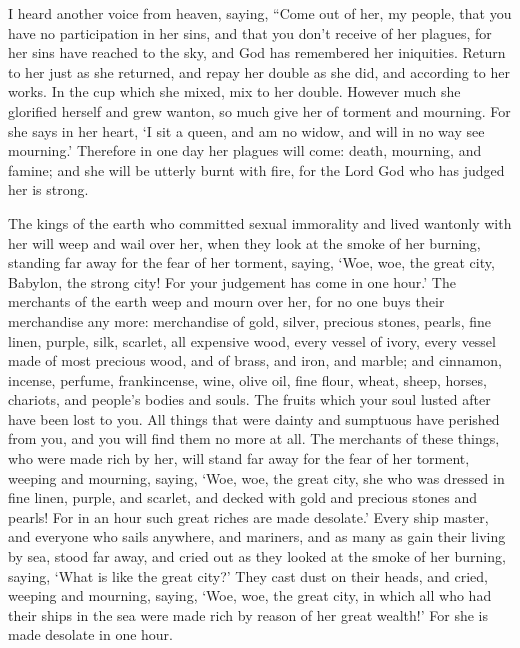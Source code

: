  I heard another voice from heaven, saying, ``Come out of
her, my people, that you have no participation in her sins, and that you
don't receive of her plagues,  for her sins have reached to
the sky, and God has remembered her iniquities.  Return to
her just as she returned, and repay her double as she did, and according
to her works. In the cup which she mixed, mix to her double.
 However much she glorified herself and grew wanton, so much
give her of torment and mourning. For she says in her heart, `I sit a
queen, and am no widow, and will in no way see mourning.' 
Therefore in one day her plagues will come: death, mourning, and famine;
and she will be utterly burnt with fire, for the Lord God who has judged
her is strong.

 The kings of the earth who committed sexual immorality and
lived wantonly with her will weep and wail over her, when they look at
the smoke of her burning,  standing far away for the fear
of her torment, saying, `Woe, woe, the great city, Babylon, the strong
city! For your judgement has come in one hour.'  The
merchants of the earth weep and mourn over her, for no one buys their
merchandise any more:  merchandise of gold, silver,
precious stones, pearls, fine linen, purple, silk, scarlet, all
expensive wood, every vessel of ivory, every vessel made of most
precious wood, and of brass, and iron, and marble;  and
cinnamon, incense, perfume, frankincense, wine, olive oil, fine flour,
wheat, sheep, horses, chariots, and people's bodies and souls.
 The fruits which your soul lusted after have been lost to
you. All things that were dainty and sumptuous have perished from you,
and you will find them no more at all.  The merchants of
these things, who were made rich by her, will stand far away for the
fear of her torment, weeping and mourning,  saying, `Woe,
woe, the great city, she who was dressed in fine linen, purple, and
scarlet, and decked with gold and precious stones and pearls!
 For in an hour such great riches are made desolate.' Every
ship master, and everyone who sails anywhere, and mariners, and as many
as gain their living by sea, stood far away,  and cried out
as they looked at the smoke of her burning, saying, `What is like the
great city?'  They cast dust on their heads, and cried,
weeping and mourning, saying, `Woe, woe, the great city, in which all
who had their ships in the sea were made rich by reason of her great
wealth!' For she is made desolate in one hour.

